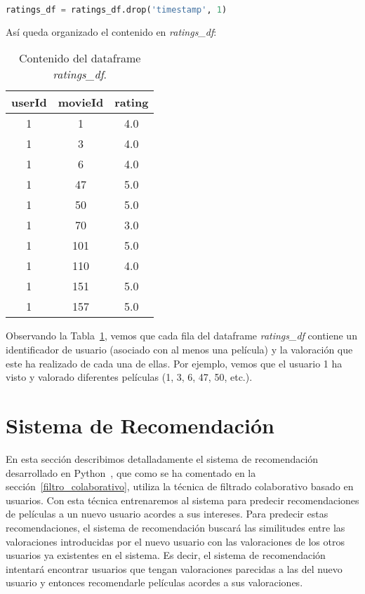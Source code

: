 \documentclass{uimppracticas}
\begin{document}
\begin{lstlisting}[language=python, basicstyle=\footnotesize, belowskip=-0.5 \baselineskip]
ratings_df = ratings_df.drop('timestamp', 1)
\end{lstlisting}

Así queda organizado el contenido en \textit{ratings\_df}:

\begin{table}[H]
	\centering
	\begin{tabular}{ccc}
		\toprule
		userId &  movieId &  rating \\
		\midrule
		1 &        1 &     4.0 \\
		1 &        3 &     4.0 \\
		1 &        6 &     4.0 \\
		1 &       47 &     5.0 \\
		1 &       50 &     5.0 \\
		1 &       70 &     3.0 \\
		1 &      101 &     5.0 \\
		1 &      110 &     4.0 \\
		1 &      151 &     5.0 \\
		1 &      157 &     5.0 \\
		\bottomrule
	\end{tabular}
	\caption{Contenido del dataframe \textit{ratings\_df}.}
	\label{ratings_df}
\end{table}

Observando la Tabla~\ref{ratings_df}, vemos que cada fila del dataframe \textit{ratings\_df} contiene un identificador de usuario (asociado con al menos una película) y la valoración que este ha realizado de cada una de ellas. Por ejemplo, vemos que el usuario 1 ha visto y valorado diferentes películas (1, 3, 6, 47, 50, etc.).

\section{Sistema de Recomendación}\label{sistema_recomendacion}

En esta sección describimos detalladamente el sistema de recomendación desarrollado en Python~\cite{GitHubRepo}, que como se ha comentado en la sección~\ref{filtro_colaborativo}, utiliza la técnica de filtrado colaborativo basado en usuarios. Con esta técnica entrenaremos al sistema para predecir recomendaciones de películas a un nuevo usuario acordes a sus intereses. Para predecir estas recomendaciones, el sistema de recomendación buscará las similitudes entre las valoraciones introducidas por el nuevo usuario con las valoraciones de los otros usuarios ya existentes en el sistema. Es decir, el sistema de recomendación intentará encontrar usuarios que tengan valoraciones parecidas a las del nuevo usuario y entonces recomendarle películas acordes a sus valoraciones. 
\end{document}
